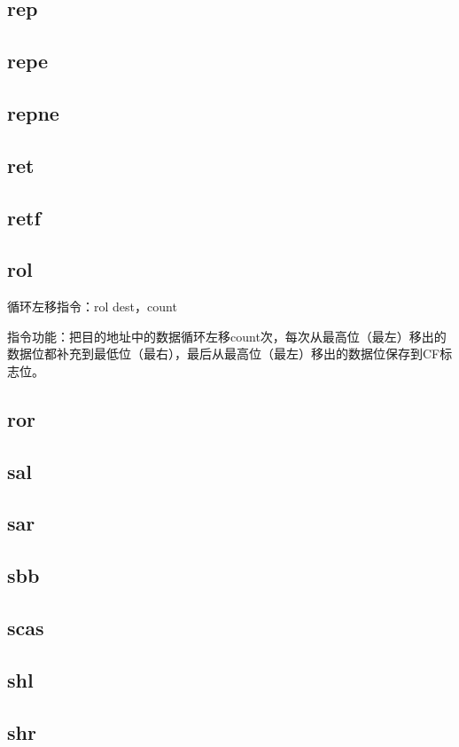 \documentclass[a4paper,left=2.5cm,right=2.5cm,11pt]{article}
\begin{document}
\subsection{rep}
\subsection{repe}
\subsection{repne}
\subsection{ret}
\subsection{retf}
\subsection{rol}
	循环左移指令：rol dest，count\par

	指令功能：把目的地址中的数据循环左移count次，每次从最高位（最左）移出的数据位都补充到最低位（最右），最后从最高位（最左）移出的数据位保存到CF标志位。

\subsection{ror}
\subsection{sal}
\subsection{sar}
\subsection{sbb}
\subsection{scas}
\subsection{shl}
\subsection{shr}
\end{document}

